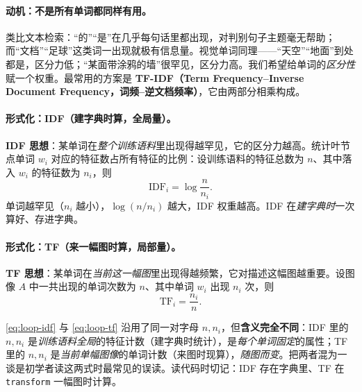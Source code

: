 \paragraph{动机：不是所有单词都同样有用。}
类比文本检索\cite{gaoxiang2019slam14}：“的”“是”在几乎每句话里都出现，对判别句子主题毫无帮助；而“文档”“足球”这类词一出现就极有信息量。视觉单词同理——“天空”“地面”到处都是，区分力低；“某面带涂鸦的墙”很罕见，区分力高。我们希望给单词的\emph{区分性}赋一个权重。最常用的方案是 \textbf{TF-IDF（Term Frequency--Inverse Document Frequency，词频--逆文档频率）}\cite{sivic2003video}，它由两部分相乘构成。

\paragraph{形式化：IDF（建字典时算，全局量）。}
\textbf{IDF 思想}：某单词在\emph{整个训练语料}里出现得越罕见，它的区分力越高。统计叶节点单词 $w_i$ 对应的特征数占所有特征的比例：设训练语料的特征总数为 $n$、其中落入 $w_i$ 的特征数为 $n_i$，则
\begin{equation}
  \mathrm{IDF}_i = \log\frac{n}{n_i}.
  \label{eq:loop-idf}
\end{equation}
单词越罕见（$n_i$ 越小），$\log(n/n_i)$ 越大，IDF 权重越高\cite{gaoxiang2019slam14}。IDF 在\emph{建字典时}一次算好、存进字典。

\paragraph{形式化：TF（来一幅图时算，局部量）。}
\textbf{TF 思想}：某单词在\emph{当前这一幅图}里出现得越频繁，它对描述这幅图越重要。设图像 $A$ 中一共出现的单词次数为 $n$、其中单词 $w_i$ 出现 $n_i$ 次，则
\begin{equation}
  \mathrm{TF}_i = \frac{n_i}{n}.
  \label{eq:loop-tf}
\end{equation}

\begin{pitfall}
\cref{eq:loop-idf} 与 \cref{eq:loop-tf} 沿用了同一对字母 $n,n_i$，但\textbf{含义完全不同}\cite{gaoxiang2019slam14}：IDF 里的 $n,n_i$ 是\emph{训练语料全局}的特征计数（建字典时统计），是\emph{每个单词固定}的属性；TF 里的 $n,n_i$ 是\emph{当前单幅图像}的单词计数（来图时现算），\emph{随图而变}。把两者混为一谈是初学者读这两式时最常见的误读。读代码时切记：IDF 存在字典里、TF 在 \verb|transform| 一幅图时计算。
\end{pitfall}

